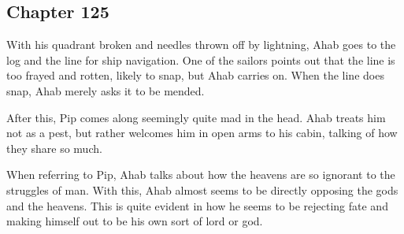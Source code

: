 \subsection{Chapter 125}

With his quadrant broken and needles thrown off by lightning, Ahab goes to the
log and the line for ship navigation. One of the sailors points out that the
line is too frayed and rotten, likely to snap, but Ahab carries on. When the
line does snap, Ahab merely asks it to be mended.

After this, Pip comes along seemingly quite mad in the head. Ahab treats him
not as a pest, but rather welcomes him in open arms to his cabin, talking of
how they share so much.

When referring to Pip, Ahab talks about how the heavens are so ignorant to the
struggles of man. With this, Ahab almost seems to be directly opposing the gods
and the heavens. This is quite evident in how he seems to be rejecting fate and
making himself out to be his own sort of lord or god.

